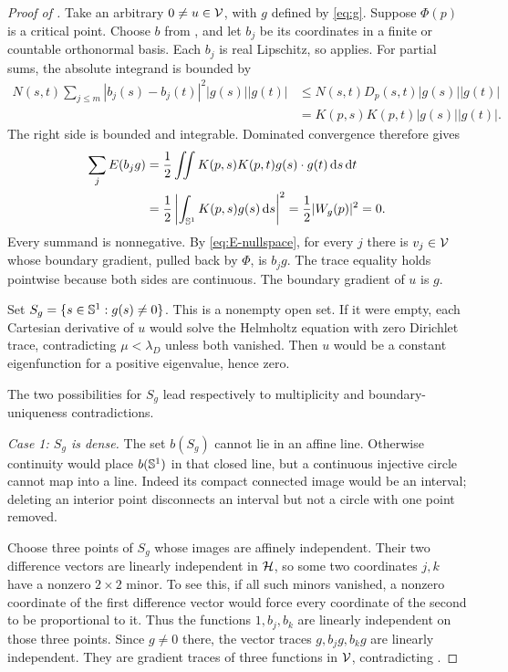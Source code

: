 \begin{proof}[Proof of ]
Take an arbitrary $0\ne u\in\mathcal V$, with $g$ defined by \eqref{eq:g}. Suppose $\Phi(p)$ is a critical point. Choose $b$ from , and let $b_j$ be its coordinates in a finite or countable orthonormal basis. Each $b_j$ is real Lipschitz, so  applies. For partial sums, the absolute integrand is bounded by
\begin{align*}
N(s,t)\sum_{j\le m}|b_j(s)-b_j(t)|^2|g(s)||g(t)|
&\le N(s,t)D_p(s,t)|g(s)||g(t)|\\
&=K(p,s)K(p,t)|g(s)||g(t)|.
\end{align*}
The right side is bounded and integrable. Dominated convergence therefore gives
\begin{align}
\sum_j E(b_jg)
&=\frac12\iint K(p,s)K(p,t)g(s)\cdot g(t)\,\mathrm d s\,\mathrm d t\notag\\
&=\frac12\left|\int_{\mathbb S^1}K(p,s)g(s)\,\mathrm d s\right|^2
=\frac12|W_g(p)|^2=0.\label{eq:sum-energy}
\end{align}
Every summand is nonnegative. By \eqref{eq:E-nullspace}, for every $j$ there is $v_j\in\mathcal V$ whose boundary gradient, pulled back by $\Phi$, is $b_jg$. The trace equality holds pointwise because both sides are continuous. The boundary gradient of $u$ is $g$.

Set $S_g=\{s\in\mathbb S^1:g(s)\ne0\}$. This is a nonempty open set. If it were empty, each Cartesian derivative of $u$ would solve the Helmholtz equation with zero Dirichlet trace, contradicting $\mu<\lambda_D$ unless both vanished. Then $u$ would be a constant eigenfunction for a positive eigenvalue, hence zero.

The two possibilities for $S_g$ lead respectively to multiplicity and boundary-uniqueness contradictions.

\smallskip\noindent
\emph{Case 1: $S_g$ is dense.}
The set $b(S_g)$ cannot lie in an affine line. Otherwise continuity would place $b(\mathbb S^1)$ in that closed line, but a continuous injective circle cannot map into a line. Indeed its compact connected image would be an interval; deleting an interior point disconnects an interval but not a circle with one point removed.

Choose three points of $S_g$ whose images are affinely independent. Their two difference vectors are linearly independent in $\mathcal H$, so some two coordinates $j,k$ have a nonzero $2\times2$ minor. To see this, if all such minors vanished, a nonzero coordinate of the first difference vector would force every coordinate of the second to be proportional to it. Thus the functions $1,b_j,b_k$ are linearly independent on those three points. Since $g\ne0$ there, the vector traces $g,b_jg,b_kg$ are linearly independent. They are gradient traces of three functions in $\mathcal V$, contradicting .


\end{proof}
